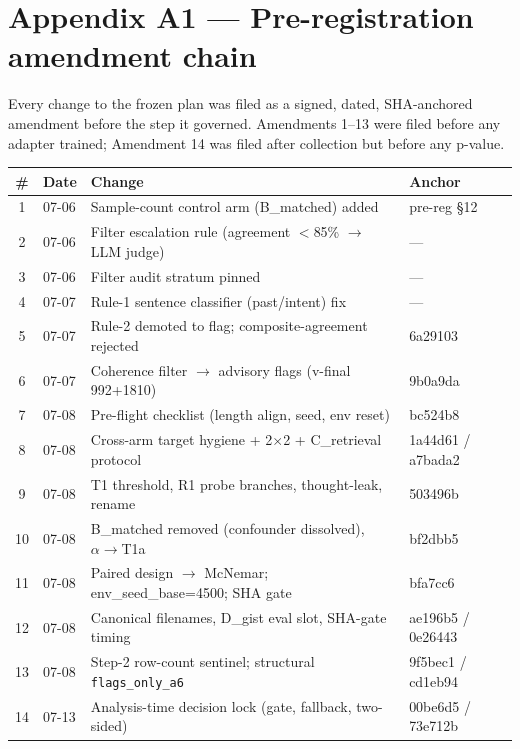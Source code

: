\section*{Appendix A1 --- Pre-registration amendment chain}

Every change to the frozen plan was filed as a signed, dated,
SHA-anchored amendment before the step it governed. Amendments 1--13
were filed before any adapter trained; Amendment 14 was filed after
collection but before any p-value.

\begin{table}[h]
\centering
\begin{tabular}{c l p{7.2cm} l}
\toprule
\# & Date & Change & Anchor \\
\midrule
1 & 07-06 & Sample-count control arm (B\_matched) added & pre-reg \S12 \\
2 & 07-06 & Filter escalation rule (agreement $<$85\% $\rightarrow$ LLM judge) & --- \\
3 & 07-06 & Filter audit stratum pinned & --- \\
4 & 07-07 & Rule-1 sentence classifier (past/intent) fix & --- \\
5 & 07-07 & Rule-2 demoted to flag; composite-agreement rejected & 6a29103 \\
6 & 07-07 & Coherence filter $\rightarrow$ advisory flags (v-final 992+1810) & 9b0a9da \\
7 & 07-08 & Pre-flight checklist (length align, seed, env reset) & bc524b8 \\
8 & 07-08 & Cross-arm target hygiene + 2$\times$2 + C\_retrieval protocol & 1a44d61 / a7bada2 \\
9 & 07-08 & T1 threshold, R1 probe branches, thought-leak, rename & 503496b \\
10 & 07-08 & B\_matched removed (confounder dissolved), $\alpha\rightarrow$T1a & bf2dbb5 \\
11 & 07-08 & Paired design $\rightarrow$ McNemar; env\_seed\_base=4500; SHA gate & bfa7cc6 \\
12 & 07-08 & Canonical filenames, D\_gist eval slot, SHA-gate timing & ae196b5 / 0e26443 \\
13 & 07-08 & Step-2 row-count sentinel; structural \texttt{flags\_only\_a6} & 9f5bec1 / cd1eb94 \\
14 & 07-13 & Analysis-time decision lock (gate, fallback, two-sided) & 00be6d5 / 73e712b \\
\bottomrule
\end{tabular}
\end{table}

